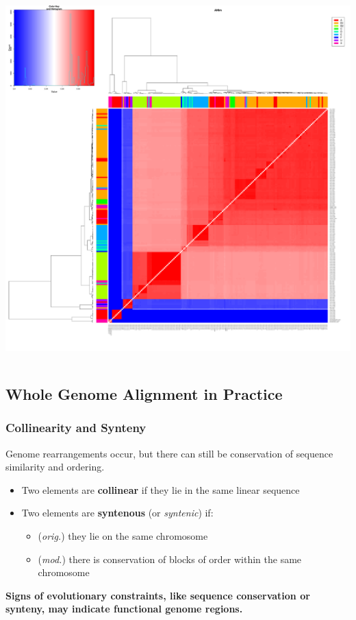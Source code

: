 \begin{frame}
\begin{columns}[T]
\begin{column}{5cm}
      \includegraphics[width=1\textwidth]{images/ANIm_Ecoli}
    \end{column}
  \end{columns}       
\end{frame}

\subsection{Whole Genome Alignment in Practice}

\begin{frame}
  \frametitle{Collinearity and Synteny}
  Genome rearrangements occur, but there can still be conservation of sequence similarity and ordering.\\
  \begin{itemize}
    \item Two elements are \textbf{collinear} if they lie in the same linear sequence
    \item Two elements are \textbf{syntenous} (or \textit{syntenic}) if:
    \begin{itemize}
      \item (\textit{orig.}) they lie on the same chromosome
      \item (\textit{mod.}) there is conservation of blocks of order within the same chromosome
    \end{itemize}
  \end{itemize}    
  \textbf{Signs of evolutionary constraints, like sequence conservation or synteny, may indicate functional genome regions.}
\end{frame}

